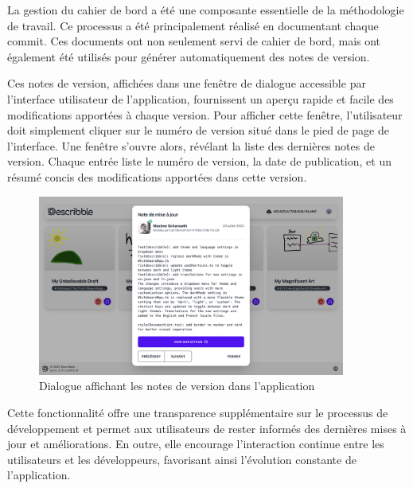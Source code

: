 La gestion du cahier de bord a été une composante essentielle de la méthodologie de travail. Ce processus a été principalement réalisé en documentant chaque commit. Ces documents ont non seulement servi de cahier de bord, mais ont également été utilisés pour générer automatiquement des notes de version.

Ces notes de version, affichées dans une fenêtre de dialogue accessible par l'interface utilisateur de l'application, fournissent un aperçu rapide et facile des modifications apportées à chaque version. Pour afficher cette fenêtre, l'utilisateur doit simplement cliquer sur le numéro de version situé dans le pied de page de l'interface. Une fenêtre s'ouvre alors, révélant la liste des dernières notes de version. Chaque entrée liste le numéro de version, la date de publication, et un résumé concis des modifications apportées dans cette version.

\begin{figure}[H]
    \centering
    \includegraphics[width=0.9\textwidth]{assets/figures/patch_notes.png}
    \caption{Dialogue affichant les notes de version dans l'application}
\end{figure}

Cette fonctionnalité offre une transparence supplémentaire sur le processus de développement et permet aux utilisateurs de rester informés des dernières mises à jour et améliorations. En outre, elle encourage l'interaction continue entre les utilisateurs et les développeurs, favorisant ainsi l'évolution constante de l'application.